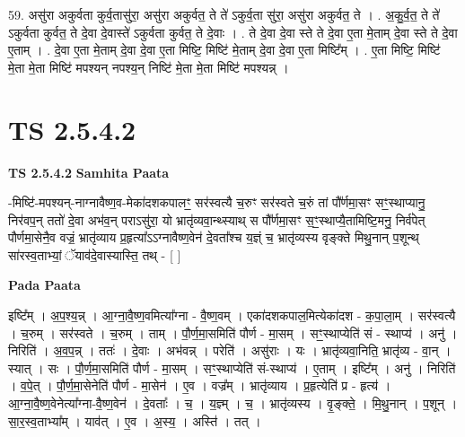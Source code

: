 \documentclass[17pt]{extarticle}
\begin{document}
59. असु॑रा अकुर्वता कुर्व॒तासु॑रा॒ असु॑रा अकुर्वत॒ ते ते॑ ऽकुर्व॒ता सु॑रा॒ असु॑रा अकुर्वत॒ ते । . अ॒कु॒र्व॒त॒ ते ते॑ ऽकुर्वता कुर्वत॒ ते दे॒वा दे॒वास्ते॑ ऽकुर्वता कुर्वत॒ ते दे॒वाः । . ते दे॒वा दे॒वा स्ते ते दे॒वा ए॒ता मे॒ताम् दे॒वा स्ते ते दे॒वा ए॒ताम् । . दे॒वा ए॒ता मे॒ताम् दे॒वा दे॒वा ए॒ता मिष्टि॒ मिष्टि॑ मे॒ताम् दे॒वा दे॒वा ए॒ता मिष्टि᳚म् । . ए॒ता मिष्टि॒ मिष्टि॑ मे॒ता मे॒ता मिष्टि॑ मपश्यन् नपश्य॒न् निष्टि॑ मे॒ता मे॒ता मिष्टि॑ मपश्यन्न् । \newline
\pagebreak
{}
\section*{ TS 2.5.4.2 }

\textbf{TS 2.5.4.2 } \newline
\textbf{Samhita Paata} \newline

-मिष्टि॑-मपश्यन्-नाग्नावैष्ण॒व-मेका॑दशकपालꣳ॒॒ सर॑स्वत्यै च॒रुꣳ सर॑स्वते च॒रुं तां पौ᳚र्णमा॒सꣳ सꣳ॒॒स्थाप्यानु॒ निर॑वप॒न् ततो॑ दे॒वा अभ॑व॒न् पराऽसु॑रा॒ यो भ्रातृ॑व्यवा॒न्थ्स्याथ् स पौ᳚र्णमा॒सꣳ स॒ꣳ॒॒स्थाप्यै॒तामिष्टि॒मनु॒ निर्व॑पेत् पौर्णमा॒सेनै॒व वज्रं॒ भ्रातृ॑व्याय प्र॒हृत्या᳚ऽऽग्नावैष्ण॒वेन॑ दे॒वता᳚श्च य॒ज्ञ्ं च॒ भ्रातृ॑व्यस्य वृङ्क्ते मिथु॒नान् प॒शून्थ् सा॑रस्व॒ताभ्यां॒ ॅयाव॑दे॒वास्यास्ति॒ तथ् - [  ] \newline

\textbf{Pada Paata} \newline

इष्टि᳚म् । अ॒प॒श्य॒न्न् । आ॒ग्ना॒वै॒ष्ण॒वमित्या᳚ग्ना - वै॒ष्ण॒वम् । एका॑दशकपाल॒मित्येका॑दश - क॒पा॒ला॒म् । सर॑स्वत्यै । च॒रुम् । सर॑स्वते । च॒रुम् । ताम् । पौ॒र्ण॒मा॒समिति॑ पौर्ण - मा॒सम् । सꣳ॒॒स्थाप्येति॑ सं - स्थाप्य॑ । अनु॑ । निरिति॑ । अ॒व॒प॒न्न् । ततः॑ । दे॒वाः । अभ॑वन्न् । परेति॑ । असु॑राः । यः । भ्रातृ॑व्यवा॒निति॒ भ्रातृ॑व्य - वा॒न् । स्यात् । सः । पौ॒र्ण॒मा॒समिति॑ पौर्ण - मा॒सम् । सꣳ॒॒स्थाप्येति॑ सं-स्थाप्य॑ । ए॒ताम् । इष्टि᳚म् । अनु॑ । निरिति॑ । व॒पे॒त् । पौ॒र्ण॒मा॒सेनेति॑ पौर्ण - मा॒सेन॑ । ए॒व । वज्र᳚म् । भ्रातृ॑व्याय । प्र॒हृत्येति॑ प्र - हृत्य॑ । आ॒ग्ना॒वै॒ष्ण॒वेनेत्या᳚ग्ना-वै॒ष्ण॒वेन॑ । दे॒वताः᳚ । च॒ । य॒ज्ञ्म् । च॒ । भ्रातृ॑व्यस्य । वृ॒ङ्क्ते॒ । मि॒थु॒नान् । प॒शून् । सा॒र॒स्व॒ताभ्या᳚म् । याव॑त् । ए॒व । अ॒स्य॒ । अस्ति॑ । तत् ।  \newline
\end{document}

